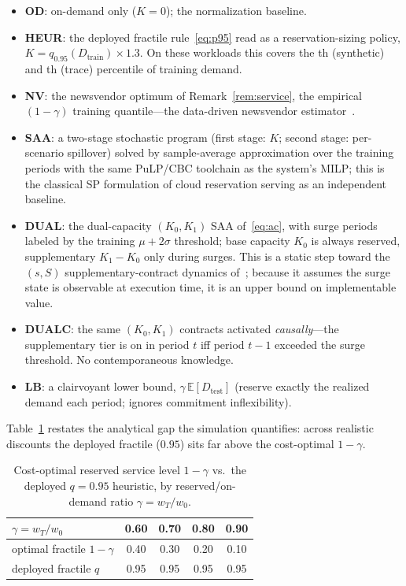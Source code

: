 \documentclass[10pt,journal]{IEEEtran}
\newcommand{\E}{\mathbb{E}}
\begin{document}
\begin{itemize}
\item \textbf{OD}: on-demand only ($K{=}0$); the normalization baseline.
\item \textbf{HEUR}: the deployed fractile rule~\eqref{eq:p95} read as a
reservation-sizing policy, $K = q_{0.95}(D_{\mathrm{train}})\times 1.3$. On
these workloads this covers the \polImpliedQ th (synthetic) and
\extPolImpliedQ th (trace) percentile of training demand.
\item \textbf{NV}: the newsvendor optimum of Remark~\ref{rem:service}, the
empirical $(1{-}\gamma)$ training quantile---the data-driven newsvendor
estimator~\cite{arrow1951inventory,ban2019newsvendor}.
\item \textbf{SAA}: a two-stage stochastic program (first stage: $K$; second
stage: per-scenario spillover) solved by sample-average approximation over
the training periods with the same PuLP/CBC toolchain as the system's MILP;
this is the classical SP formulation of cloud reservation
\cite{chaisiri2012provisioning,bulbul2021provisioning} serving as an
independent baseline.
\item \textbf{DUAL}: the dual-capacity $(K_0,K_1)$ SAA of~\eqref{eq:ac},
with surge periods labeled by the training $\mu+2\sigma$ threshold; base
capacity $K_0$ is always reserved, supplementary $K_1-K_0$ only during
surges. This is a static step toward the $(s,S)$ supplementary-contract
dynamics of~\cite{chen2024capacity}; because it assumes the surge state is
observable at execution time, it is an upper bound on implementable value.
\item \textbf{DUALC}: the same $(K_0,K_1)$ contracts activated
\emph{causally}---the supplementary tier is on in period $t$ iff period
$t{-}1$ exceeded the surge threshold. No contemporaneous knowledge.
\item \textbf{LB}: a clairvoyant lower bound, $\gamma\,\E[D_{\mathrm{test}}]$
(reserve exactly the realized demand each period; ignores commitment
inflexibility).
\end{itemize}

Table~\ref{tab:fractile} restates the analytical gap the simulation
quantifies: across realistic discounts the deployed fractile ($0.95$) sits
far above the cost-optimal $1-\gamma$.

\begin{table}[t]
\caption{Cost-optimal reserved service level $1-\gamma$ vs.\ the deployed
$q{=}0.95$ heuristic, by reserved/on-demand ratio $\gamma=w_T/w_0$.}
\label{tab:fractile}
\centering
\renewcommand{\arraystretch}{1.15}
\begin{tabular}{@{}l c c c c@{}}
\toprule
$\gamma=w_T/w_0$ & 0.60 & 0.70 & 0.80 & 0.90 \\
\midrule
optimal fractile $1-\gamma$ & 0.40 & 0.30 & 0.20 & 0.10 \\
deployed fractile $q$       & 0.95 & 0.95 & 0.95 & 0.95 \\
\bottomrule
\end{tabular}
\end{table}
\end{document}

